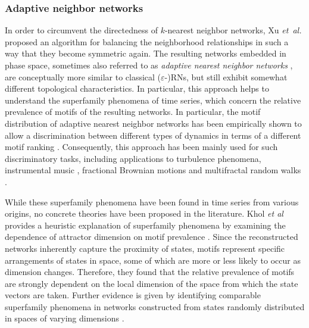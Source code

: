 		\subsubsection{Adaptive neighbor networks}
		In order to circumvent the directedness of $k$-nearest neighbor networks, Xu \textit{et~al.} \cite{Small2009,Xu2008} proposed an algorithm for balancing the neighborhood relationships in such a way that they become symmetric again. The resulting networks embedded in phase space, sometimes also referred to as \emph{adaptive nearest neighbor networks} \cite{Donner2011}, are conceptually more similar to classical ($\varepsilon$-)RNs, but still exhibit somewhat different topological characteristics. In particular, this approach helps to understand the superfamily phenomena of time series, which concern the relative prevalence of motifs of the resulting networks. In particular, the motif distribution of adaptive nearest neighbor networks has been empirically shown to allow a discrimination between different types of dynamics in terms of a different motif ranking \cite{Xu2008}. Consequently, this approach has been mainly used for such discriminatory tasks, including applications to turbulence phenomena, instrumental music \cite{Donner2011}, fractional Brownian motions and multifractal random walks \cite{Liu2010a}. 
		
		While these superfamily phenomena have been found in time series from various origins, no concrete theories have been proposed in the literature. Khol {\textit{et al}} provides a heuristic explanation of superfamily phenomena by examining the dependence of attractor dimension on motif prevalence \cite{Khor2016}. Since the reconstructed networks inherently capture the proximity of states, motifs represent specific arrangements of states in space, some of which are more or less likely to occur as dimension changes. Therefore, they found that the relative prevalence of motifs are strongly dependent on the local dimension of the space from which the state vectors are taken. Further evidence is given by identifying comparable superfamily phenomena in networks constructed from states randomly distributed in spaces of varying dimensions \cite{Khor2016}.

